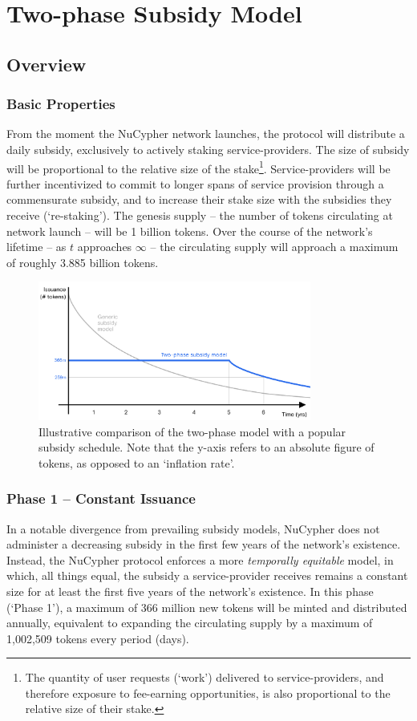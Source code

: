 \documentclass[longbibliography,nofootinbib]{revtex4-1}
\begin{document}
\section{Two-phase Subsidy Model}

\subsection{Overview}

\subsubsection{Basic Properties}
From the moment the NuCypher network launches, the protocol will distribute a daily subsidy, exclusively to actively staking service-providers. The size of subsidy will be proportional to the relative size of the stake\footnote[2]{The quantity of user requests (`work') delivered to service-providers, and therefore exposure to fee-earning opportunities, is also proportional to the relative size of their stake.}. Service-providers will be further incentivized to commit to longer spans of service provision through a commensurate subsidy, and to increase their stake size with the subsidies they receive (`re-staking'). The genesis supply – the number of tokens circulating at network launch – will be 1 billion tokens. Over the course of the network's lifetime – as $t$ approaches $\infty$ – the circulating supply will approach a maximum of roughly 3.885 billion tokens.

\begin{figure}[h!]
    \includegraphics[width=0.8\textwidth]{Two_phase_model.png}
    \caption{Illustrative comparison of the two-phase model with a popular subsidy schedule. Note that the y-axis refers to an absolute figure of tokens, as opposed to an `inflation rate'.}
    \label{fig:tp}
\end{figure}

\subsubsection{Phase 1 – Constant Issuance}
In a notable divergence from prevailing subsidy models, NuCypher does not administer a decreasing subsidy in the first few years of the network's existence. Instead, the NuCypher protocol enforces a more \textit{temporally equitable} model, in which, all things equal, the subsidy a service-provider receives remains a constant size for at least the first five years of the network's existence. In this phase (`Phase 1'), a maximum of 366 million new tokens will be minted and distributed annually, equivalent to expanding the circulating supply by a maximum of 1,002,509 tokens every period (days). 
\end{document}
